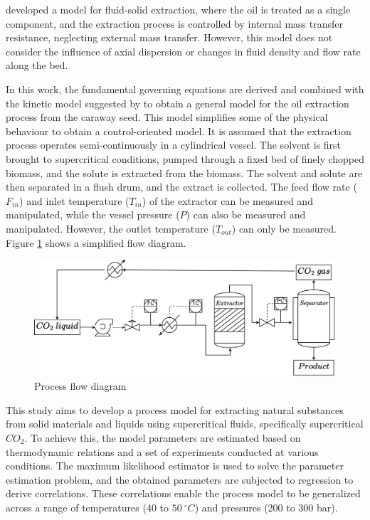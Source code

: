 \documentclass[../Article_Model_Parameters.tex]{subfiles}
\begin{document}
	\citet{Reverchon1996} developed a model for fluid-solid extraction, where the oil is treated as a single component, and the extraction process is controlled by internal mass transfer resistance, neglecting external mass transfer. However, this model does not consider the influence of axial dispersion or changes in fluid density and flow rate along the bed.
	
	In this work, the fundamental governing equations are derived and combined with the kinetic model suggested by \citet{Reverchon1996} to obtain a general model for the oil extraction process from the caraway seed. This model simplifies some of the physical behaviour to obtain a control-oriented model. It is assumed that the extraction process operates semi-continuously in a cylindrical vessel. The solvent is first brought to supercritical conditions, pumped through a fixed bed of finely chopped biomass, and the solute is extracted from the biomass. The solvent and solute are then separated in a flush drum, and the extract is collected. The feed flow rate ($F_{in}$) and inlet temperature ($T_{in}$) of the extractor can be measured and manipulated, while the vessel pressure ($P$) can also be measured and manipulated. However, the outlet temperature ($T_{out}$) can only be measured. Figure \ref{fig: SFE_drawing} shows a simplified flow diagram.
	
	\begin{figure}[h!]
		\centering
		\includegraphics[width=\columnwidth]{Figures/PFD.drawio.pdf}
		\caption{Process flow diagram}
		\label{fig: SFE_drawing}
	\end{figure}

	This study aims to develop a process model for extracting natural substances from solid materials and liquids using supercritical fluids, specifically supercritical $CO_2$. To achieve this, the model parameters are estimated based on thermodynamic relations and a set of experiments conducted at various conditions. The maximum likelihood estimator is used to solve the parameter estimation problem, and the obtained parameters are subjected to regression to derive correlations. These correlations enable the process model to be generalized across a range of temperatures (40 to $50~^\circ C$) and pressures (200 to 300 bar).
	
\end{document}
